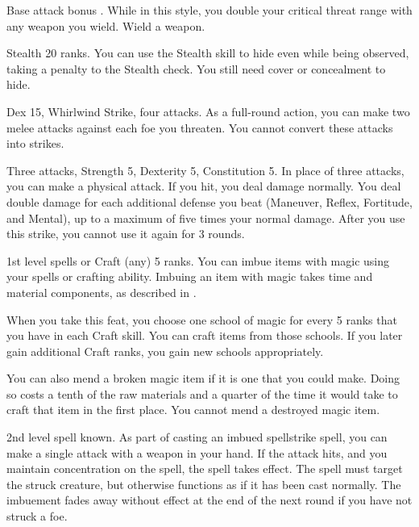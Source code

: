 \featpre Base attack bonus .
\featben While in this style, you double your critical threat range with any weapon you wield.
\stylereq Wield a weapon.

\featpre Stealth 20 ranks.
\featben You can use the Stealth skill to hide even while being observed, taking a  penalty to the Stealth check.
You still need cover or concealment to hide.

\featpres Dex 15, Whirlwind Strike, four attacks.
\featben As a full-round action, you can make two melee attacks against each foe you threaten. You cannot convert these attacks into strikes.

\featpre Three attacks, Strength 5, Dexterity 5, Constitution 5.
\featben In place of three attacks, you can make a physical attack.
If you hit, you deal damage normally.
You deal double damage for each additional defense you beat (Maneuver, Reflex, Fortitude, and Mental), up to a maximum of five times your normal damage.
After you use this strike, you cannot use it again for 3 rounds.

\featpre 1st level spells or Craft (any) 5 ranks.
\featben You can imbue items with magic using your spells or crafting ability.
Imbuing an item with magic takes time and material components, as described in .

When you take this feat, you choose one school of magic for every 5 ranks that you have in each Craft skill.
You can craft items from those schools.
If you later gain additional Craft ranks, you gain new schools appropriately.

You can also mend a broken magic item if it is one that you could make.
Doing so costs a tenth of the raw materials and a quarter of the time it would take to craft that item in the first place.
You cannot mend a destroyed magic item.

\featpre 2nd level spell known.
\featben As part of casting an imbued spellstrike spell, you can make a single attack with a weapon in your hand.
If the attack hits, and you maintain concentration on the spell, the spell takes effect.
The spell must target the struck creature, but otherwise functions as if it has been cast normally.
The imbuement fades away without effect at the end of the next round if you have not struck a foe.

